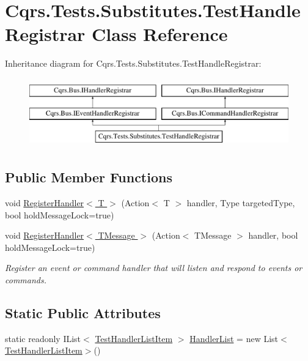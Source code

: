 \hypertarget{classCqrs_1_1Tests_1_1Substitutes_1_1TestHandleRegistrar}{}\section{Cqrs.\+Tests.\+Substitutes.\+Test\+Handle\+Registrar Class Reference}
\label{classCqrs_1_1Tests_1_1Substitutes_1_1TestHandleRegistrar}
Inheritance diagram for Cqrs.\+Tests.\+Substitutes.\+Test\+Handle\+Registrar\+:\begin{figure}[H]
\begin{center}
\leavevmode
\includegraphics[height=3.000000cm]{classCqrs_1_1Tests_1_1Substitutes_1_1TestHandleRegistrar}
\end{center}
\end{figure}
\subsection*{Public Member Functions}
\begin{DoxyCompactItemize}
\item 
void \hyperlink{classCqrs_1_1Tests_1_1Substitutes_1_1TestHandleRegistrar_a0c594dfb7108ec35a3b226fcc2ab84e2_a0c594dfb7108ec35a3b226fcc2ab84e2}{Register\+Handler$<$ T $>$} (Action$<$ T $>$ handler, Type targeted\+Type, bool hold\+Message\+Lock=true)
\item 
void \hyperlink{classCqrs_1_1Tests_1_1Substitutes_1_1TestHandleRegistrar_a8eb57abc3420b0968c08c05204caa25c_a8eb57abc3420b0968c08c05204caa25c}{Register\+Handler$<$ T\+Message $>$} (Action$<$ T\+Message $>$ handler, bool hold\+Message\+Lock=true)
\begin{DoxyCompactList}\small\item\em Register an event or command handler that will listen and respond to events or commands. \end{DoxyCompactList}\end{DoxyCompactItemize}
\subsection*{Static Public Attributes}
\begin{DoxyCompactItemize}
\item 
static readonly I\+List$<$ \hyperlink{classCqrs_1_1Tests_1_1Substitutes_1_1TestHandlerListItem}{Test\+Handler\+List\+Item} $>$ \hyperlink{classCqrs_1_1Tests_1_1Substitutes_1_1TestHandleRegistrar_a56823149a39f6208108030de47e70e09_a56823149a39f6208108030de47e70e09}{Handler\+List} = new List$<$\hyperlink{classCqrs_1_1Tests_1_1Substitutes_1_1TestHandlerListItem}{Test\+Handler\+List\+Item}$>$()
\end{DoxyCompactItemize}


